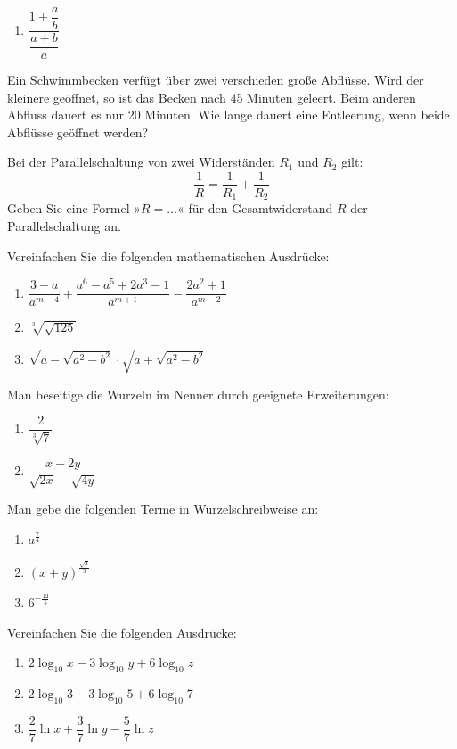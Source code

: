 \begin{uebungsaufgaben}
\begin{enumerate}[label=\alph*)]
      \item $\dfrac{1 + \dfrac{a}{b}}{\dfrac{a+b}{a}}$
    \end{enumerate}
  \item Ein Schwimmbecken verfügt über zwei verschieden große Abflüsse. Wird der kleinere geöffnet, so ist das Becken nach 45 Minuten geleert. Beim anderen Abfluss dauert es nur 20 Minuten. Wie lange dauert eine Entleerung, wenn beide Abflüsse geöffnet werden?
  \item Bei der Parallelschaltung von zwei Widerständen $R_1$ und $R_2$ gilt:
    \[ \frac{1}{R} = \frac{1}{R_1} + \frac{1}{R_2} \]
    Geben Sie eine Formel »$R = \ldots$« für den Gesamtwiderstand $R$ der Parallelschaltung an.
  \item Vereinfachen Sie die folgenden mathematischen Ausdrücke:
    \begin{enumerate}[label=\alph*)]
      \item $\dfrac{3-a}{a^{m-4}} + \dfrac{a^6 - a^5 + 2a^3 - 1}{a^{m+1}} - \dfrac{2a^2+1}{a^{m-2}}$
      \item $\sqrt[3]{\sqrt{125}}$
      \item $\sqrt{a - \sqrt{a^2 - b^2}} \cdot \sqrt{a + \sqrt{a^2 - b^2}}$
    \end{enumerate}
  \item Man beseitige die Wurzeln im Nenner durch geeignete Erweiterungen:
    \begin{enumerate}[label=\alph*)]
      \item $\dfrac{2}{\sqrt[3]{7}}$
      \item $\dfrac{x-2y}{\sqrt{2x} - \sqrt{4y}}$
    \end{enumerate}
  \item Man gebe die folgenden Terme in Wurzelschreibweise an:
    \begin{enumerate}[label=\alph*)]
      \item $a^{\frac{7}{4}}$
      \item $(x+y)^{\frac{\sqrt{2}}{3}}$
      \item $6^{-\frac{12}{5}}$
    \end{enumerate}
  \item Vereinfachen Sie die folgenden Ausdrücke:
    \begin{enumerate}[label=\alph*)]
      \item $2\log_{10} x - 3\log_{10} y + 6\log_{10} z$
      \item $2\log_{10} 3 - 3\log_{10} 5 + 6\log_{10} 7$
      \item $\dfrac{2}{7}\ln x + \dfrac{3}{7}\ln y - \dfrac{5}{7}\ln z$

\end{enumerate}
\end{uebungsaufgaben}
